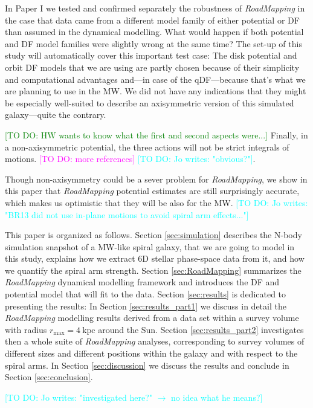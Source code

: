 \documentclass[iop,revtex4,numberedappendix,appendixfloats]{emulateapj}
\newcommand{\RM}{{\sl RoadMapping}}
\newcommand{\Wilma}[1]{\textcolor{Magenta}{#1}}
\newcommand{\HW}[1]{\textcolor{Green}{#1}}
\newcommand{\Jo}[1]{\textcolor{Cyan}{#1}}
\begin{document}
In Paper I we tested and confirmed separately the robustness of \RM{} in the case that data came from a different model family of either potential or DF than assumed in the dynamical modelling. What would happen if both potential and DF model families were slightly wrong at the same time? The set-up of this study will automatically cover this important test case: The disk potential and orbit DF models that we are using are partly chosen because of their simplicity and computational advantages and---in case of the qDF---because that's what we are planning to use in the MW. We did not have any indications that they might be especially well-suited to describe an axisymmetric version of this simulated galaxy---quite the contrary.

\HW{[TO DO: HW wants to know what the first and second aspects were...]} Finally, in a non-axisymmetric potential, the three actions will not be strict  integrals of motions. \citep{2016ApJ...824...39V} \Wilma{[TO DO: more references]} \Jo{[TO DO: Jo writes: "obvious?"]}.

Though non-axisymmetry could be a sever problem for \RM{}, we show in this paper that  \RM{} potential estimates are still surprisingly accurate, which makes us optimistic that they will be also for the MW. \Jo{[TO DO: Jo writes: "BR13 did not use in-plane motions to avoid spiral arm effects..."]}

This paper is organized as follows. Section \ref{sec:simulation} describes the N-body simulation snapshot of a MW-like spiral galaxy, that we are going to model in this study, explains how we extract 6D stellar phase-space data from it, and how we quantify the spiral arm strength. Section \ref{sec:RoadMapping} summarizes the \RM{} dynamical modelling framework and introduces the DF and potential model that will fit to the data. Section \ref{sec:results} is dedicated to presenting the results: In Section \ref{sec:results_part1} we discuss in detail the \RM{} modelling results derived from a data set within a survey volume with radius $r_\text{max}=4~\text{kpc}$ around the Sun. Section \ref{sec:results_part2} investigates then a whole suite of \RM{} analyses, corresponding to survey volumes of different sizes and different positions within the galaxy and with respect to the spiral arms. In Section \ref{sec:discussion} we discuss the results and conclude in Section \ref{sec:conclusion}.

\Jo{[TO DO: Jo writes: "investigated here?" $\longrightarrow$ no idea what he means?]}
\end{document}
